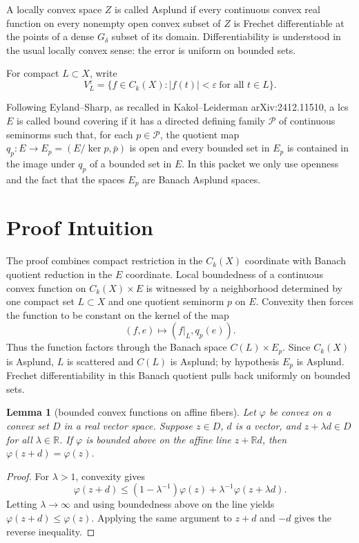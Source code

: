 \documentclass[11pt]{article}
\newtheorem{lemma}{Lemma}
\newcommand{\R}{\mathbb{R}}
\newcommand{\eps}{\varepsilon}
\begin{document}
A locally convex space $Z$ is called Asplund if every continuous convex real
function on every nonempty open convex subset of $Z$ is Frechet differentiable
at the points of a dense $G_\delta$ subset of its domain. Differentiability is
understood in the usual locally convex sense: the error is uniform on bounded
sets.

For compact $L\subset X$, write
\[
  V_L^\eps=\{f\in C_k(X): |f(t)|<\eps\ \text{for all }t\in L\}.
\]

Following Eyland--Sharp, as recalled in Kakol--Leiderman arXiv:2412.11510, a
lcs $E$ is called bound covering if it has a directed defining family
$\mathcal P$ of continuous seminorms such that, for each $p\in\mathcal P$, the
quotient map $q_p:E\to E_p=(E/\ker p,\bar p)$ is open and every bounded set in
$E_p$ is contained in the image under $q_p$ of a bounded set in $E$. In this
packet we only use openness and the fact that the spaces $E_p$ are Banach
Asplund spaces.

\section*{Proof Intuition}

The proof combines compact restriction in the $C_k(X)$ coordinate with Banach
quotient reduction in the $E$ coordinate. Local boundedness of a continuous
convex function on $C_k(X)\times E$ is witnessed by a neighborhood determined
by one compact set $L\subset X$ and one quotient seminorm $p$ on $E$. Convexity
then forces the function to be constant on the kernel of the map
\[
  (f,e)\mapsto (f|_L,q_p(e)).
\]
Thus the function factors through the Banach space $C(L)\times E_p$. Since
$C_k(X)$ is Asplund, $L$ is scattered and $C(L)$ is Asplund; by hypothesis
$E_p$ is Asplund. Frechet differentiability in this Banach quotient pulls back
uniformly on bounded sets.

\begin{lemma}[bounded convex functions on affine fibers]\label{lem:fiber}
Let $\varphi$ be convex on a convex set $D$ in a real vector space. Suppose
$z\in D$, $d$ is a vector, and $z+\lambda d\in D$ for all $\lambda\in\R$. If
$\varphi$ is bounded above on the affine line $z+\R d$, then
$\varphi(z+d)=\varphi(z)$.
\end{lemma}

\begin{proof}
For $\lambda>1$, convexity gives
\[
 \varphi(z+d)\leq (1-\lambda^{-1})\varphi(z)+\lambda^{-1}\varphi(z+\lambda d).
\]
Letting $\lambda\to\infty$ and using boundedness above on the line yields
$\varphi(z+d)\leq \varphi(z)$. Applying the same argument to $z+d$ and $-d$
gives the reverse inequality.
\end{proof}
\end{document}
